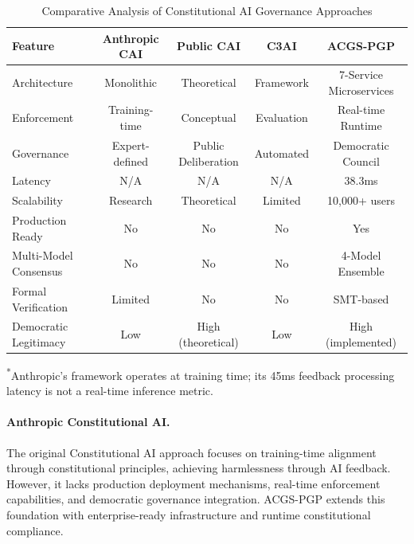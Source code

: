 \documentclass[manuscript,screen,9pt]{acmart}
\newcommand{\tablesize}{\footnotesize}
\begin{document}
\begin{table}[ht]
	\centering
	\caption{Comparative Analysis of Constitutional AI Governance Approaches}
	\label{tab:competitive_comparison}
	\tablesize
	\begin{tabular}{@{}lcccc@{}}
		\toprule
		\textbf{Feature}      & \textbf{Anthropic CAI} & \textbf{Public CAI} & \textbf{C3AI} & \textbf{ACGS-PGP}       \\
		\midrule
		Architecture          & Monolithic             & Theoretical         & Framework     & 7-Service Microservices \\
		Enforcement           & Training-time          & Conceptual          & Evaluation    & Real-time Runtime       \\
		Governance            & Expert-defined         & Public Deliberation & Automated     & Democratic Council      \\
		Latency               & N/A                    & N/A                 & N/A           & 38.3ms                  \\
		Scalability           & Research               & Theoretical         & Limited       & 10,000+ users           \\
		Production Ready      & No                     & No                  & No            & Yes                     \\
		Multi-Model Consensus & No                     & No                  & No            & 4-Model Ensemble        \\
		Formal Verification   & Limited                & No                  & No            & SMT-based               \\
		Democratic Legitimacy & Low                    & High (theoretical)  & Low           & High (implemented)      \\
		\bottomrule
	\end{tabular}
	\begin{minipage}{\linewidth}\footnotesize \textsuperscript{*}Anthropic's framework operates at training time; its 45ms feedback processing latency is not a real-time inference metric.\end{minipage}
\end{table}

\paragraph{Anthropic Constitutional AI.} The original Constitutional AI approach \citep{Bai2025ConstitutionalAI} focuses on training-time alignment through constitutional principles, achieving harmlessness through AI feedback. However, it lacks production deployment mechanisms, real-time enforcement capabilities, and democratic governance integration. ACGS-PGP extends this foundation with enterprise-ready infrastructure and runtime constitutional compliance.
\end{document}
